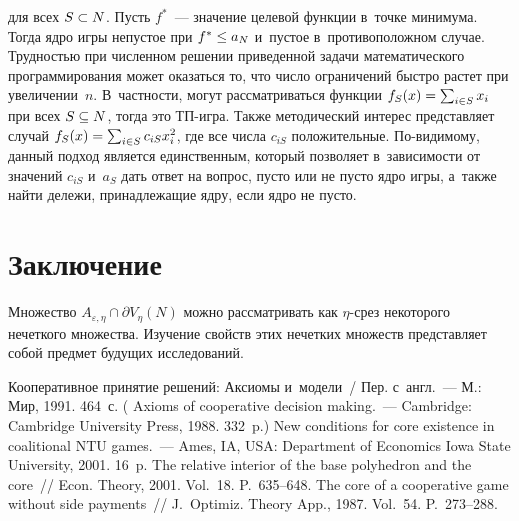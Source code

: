 \begin{multicols}{2}
\vspace*{-2pt}

\noindent
для всех $S\hm\subset N$. Пусть $f^*$~--- значение целевой функции в~точке 
минимума. Тогда ядро игры непустое при $f^*\hm\leq a_N$ и~пустое 
в~противоположном случае. Трудностью при численном решении приведенной 
задачи математического программирования может оказаться то, что число 
ограничений быстро рас\-тет при увеличении~$n$. В~частности, могут 
рассматриваться функции $f_S(x)\hm= \sum\nolimits_{i\in S} x_i$ при всех 
$S\hm\subseteq N$, тогда это ТП-иг\-ра. Также 
методический интерес представляет случай $f_S(x)\hm= \sum\nolimits_{i\in S} 
c_{iS} x_i^2$, где все числа $c_{iS}$ положительные. По-ви\-ди\-мо\-му, 
данный подход является единственным, который позволяет в~зависимости от 
значений $c_{iS}$ и~$a_S$ дать ответ на вопрос, пусто или не пусто ядро игры, 
а~также найти дележи, принадлежащие ядру, если ядро не пусто.

\vspace*{-10pt}

\section{Заключение}

\vspace*{-2pt}

    Множество $A_{\varepsilon,\eta}\cap \partial V_\eta(N)$ можно 
рассматривать как $\eta$-срез некоторого нечеткого множества. Изучение 
свойств этих нечетких множеств представляет собой предмет будущих 
исследований.

\vspace*{-10pt}

{\small\frenchspacing
 {\baselineskip=10.5pt
 \begin{thebibliography}{99}
 
 \vspace*{-2pt}
 
       Кооперативное принятие решений: Аксиомы и~модели~/ Пер. 
 с~англ.~--- М.: Мир, 1991. 464~с. ( Axioms of cooperative decision making.~--- 
Cambridge: Cambridge University Press, 1988. 332~p.)
       New conditions for core existence in coalitional NTU games.~--- Ames, IA, 
USA: Department of Economics Iowa State University, 2001. 16~p.
       The relative interior of the base polyhedron and the core~// Econ. Theory, 
2001. Vol.~18. P.~635--648.
       The core of a cooperative game without side 
payments~// J.~Optimiz. Theory App., 1987. Vol.~54. P.~273--288.




\end{thebibliography}}}
\end{multicols}
